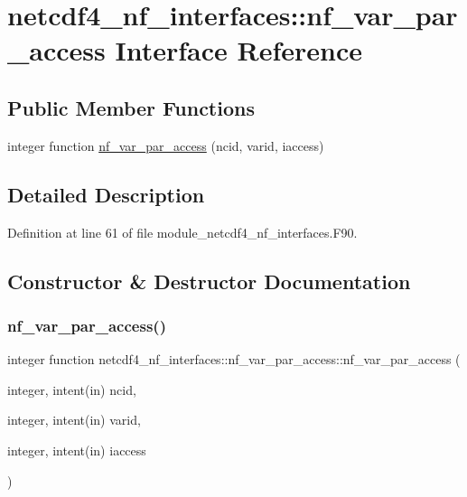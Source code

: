 \hypertarget{interfacenetcdf4__nf__interfaces_1_1nf__var__par__access}{}\section{netcdf4\+\_\+nf\+\_\+interfaces\+:\+:nf\+\_\+var\+\_\+par\+\_\+access Interface Reference}
\label{interfacenetcdf4__nf__interfaces_1_1nf__var__par__access}
\subsection*{Public Member Functions}
\begin{DoxyCompactItemize}
\item 
integer function \hyperlink{interfacenetcdf4__nf__interfaces_1_1nf__var__par__access_a79e71082ecf87222185c1a126adeb5ef}{nf\+\_\+var\+\_\+par\+\_\+access} (ncid, varid, iaccess)
\end{DoxyCompactItemize}


\subsection{Detailed Description}


Definition at line 61 of file module\+\_\+netcdf4\+\_\+nf\+\_\+interfaces.\+F90.



\subsection{Constructor \& Destructor Documentation}
\mbox{\label{interfacenetcdf4__nf__interfaces_1_1nf__var__par__access_a79e71082ecf87222185c1a126adeb5ef}} 
\subsubsection{\texorpdfstring{nf\+\_\+var\+\_\+par\+\_\+access()}{nf\_var\_par\_access()}}
{\footnotesize\ttfamily integer function netcdf4\+\_\+nf\+\_\+interfaces\+::nf\+\_\+var\+\_\+par\+\_\+access\+::nf\+\_\+var\+\_\+par\+\_\+access (\begin{DoxyParamCaption}\item[{integer, intent(in)}]{ncid,  }\item[{integer, intent(in)}]{varid,  }\item[{integer, intent(in)}]{iaccess }\end{DoxyParamCaption})}



